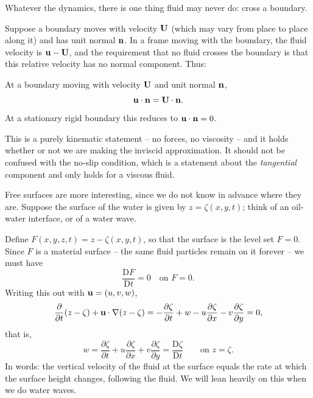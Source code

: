 \documentclass[a4paper]{scrartcl}
\newcommand{\D}{\mathrm{D}}
\newcommand{\Dt}[1]{\frac{\D #1}{\D t}}
\newcommand{\pd}[2]{\frac{\partial #1}{\partial #2}}
\begin{document}
Whatever the dynamics, there is one thing fluid may never do: cross a boundary.

Suppose a boundary moves with velocity $\mathbf{U}$ (which may vary from place to place along it) and has unit normal $\mathbf{n}$. In a frame moving with the boundary, the fluid velocity is $\mathbf{u} - \mathbf{U}$, and the requirement that no fluid crosses the boundary is that this relative velocity has no normal component. Thus:

\begin{definition}
	At a boundary moving with velocity $\mathbf{U}$ and unit normal $\mathbf{n}$,
	$$
	\mathbf{u} \cdot \mathbf{n} = \mathbf{U} \cdot \mathbf{n}.
	$$
	At a stationary rigid boundary this reduces to $\mathbf{u} \cdot \mathbf{n} = 0$.
\end{definition}

This is a purely kinematic statement -- no forces, no viscosity -- and it holds whether or not we are making the inviscid approximation. It should not be confused with the no-slip condition, which is a statement about the \emph{tangential} component and only holds for a viscous fluid.

Free surfaces are more interesting, since we do not know in advance where they are. Suppose the surface of the water is given by $z = \zeta(x, y, t)$; think of an oil-water interface, or of a water wave.

\begin{center}
\end{center}

Define $F(x, y, z, t) = z - \zeta(x, y, t)$, so that the surface is the level set $F = 0$. Since $F$ is a material surface -- the same fluid particles remain on it forever -- we must have
$$
\Dt{F} = 0 \quad \text{on } F = 0.
$$
Writing this out with $\mathbf{u} = (u, v, w)$,
$$
\pd{}{t}(z - \zeta) + \vv u \cdot \nabla (z - \zeta) = -\pd{\zeta}{t} + w - u \pd{\zeta}{x} - v\pd{\zeta}{y} = 0,
$$
that is,
$$
w = \pd{\zeta}{t} + u \pd{\zeta}{x} + v \pd{\zeta}{y} = \Dt{\zeta} \qquad \text{on } z = \zeta.
$$
In words: the vertical velocity of the fluid at the surface equals the rate at which the surface height changes, following the fluid. We will lean heavily on this when we do water waves.
\end{document}
